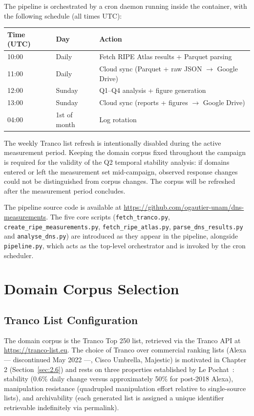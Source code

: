 The pipeline is orchestrated by a cron daemon running inside the container, with the following schedule (all times UTC):

\begin{table}[H]
\centering
\small
\begin{tabular}{l l l}
\toprule
\textbf{Time (UTC)} & \textbf{Day} & \textbf{Action} \\
\midrule
10:00 & Daily & Fetch RIPE Atlas results + Parquet parsing \\
11:00 & Daily & Cloud sync (Parquet + raw JSON $\rightarrow$ Google Drive) \\
12:00 & Sunday & Q1--Q4 analysis + figure generation \\
13:00 & Sunday & Cloud sync (reports + figures $\rightarrow$ Google Drive) \\
04:00 & 1st of month & Log rotation \\
\bottomrule
\end{tabular}
\end{table}

The weekly Tranco list refresh is intentionally disabled during the active measurement period. Keeping the domain corpus fixed throughout the campaign is required for the validity of the Q2 temporal stability analysis: if domains entered or left the measurement set mid-campaign, observed response changes could not be distinguished from corpus changes. The corpus will be refreshed after the measurement period concludes.

The pipeline source code is available at \url{https://github.com/ogautier-unam/dns-measurements}. The five core scripts (\texttt{fetch\_tranco.py}, \texttt{create\_ripe\_measurements.py}, \texttt{fetch\_ripe\_atlas.py}, \texttt{parse\_dns\_results.py} and \texttt{analyse\_dns.py}) are introduced as they appear in the pipeline, alongside \texttt{pipeline.py}, which acts as the top-level orchestrator and is invoked by the cron scheduler.

\section{Domain Corpus Selection}
\label{sec:3.2}

\subsection{Tranco List Configuration}
\label{subsec:3.2.1}

The domain corpus is the Tranco Top 250 list, retrieved via the Tranco API at \url{https://tranco-list.eu}. The choice of Tranco over commercial ranking lists (Alexa --- discontinued May 2022 ---, Cisco Umbrella, Majestic) is motivated in Chapter 2 (Section~\ref{sec:2.6}) and rests on three properties established by Le Pochat~\cite{LePochat2019}: stability (0.6\% daily change versus approximately 50\% for post-2018 Alexa), manipulation resistance (quadrupled manipulation effort relative to single-source lists), and archivability (each generated list is assigned a unique identifier retrievable indefinitely via permalink).

